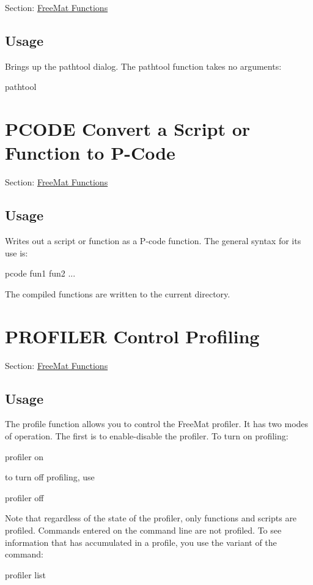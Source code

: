 Section\-: \hyperlink{sec_freemat}{Free\-Mat Functions} \hypertarget{vtkwidgets_vtkxyplotwidget_Usage}{}\subsection{Usage}\label{vtkwidgets_vtkxyplotwidget_Usage}
Brings up the pathtool dialog. The {\ttfamily pathtool} function takes no arguments\-: \begin{DoxyVerb}  pathtool
\end{DoxyVerb}
 \hypertarget{freemat_pcode}{}\section{P\-C\-O\-D\-E Convert a Script or Function to P-\/\-Code}\label{freemat_pcode}
Section\-: \hyperlink{sec_freemat}{Free\-Mat Functions} \hypertarget{vtkwidgets_vtkxyplotwidget_Usage}{}\subsection{Usage}\label{vtkwidgets_vtkxyplotwidget_Usage}
Writes out a script or function as a P-\/code function. The general syntax for its use is\-: \begin{DoxyVerb}   pcode fun1 fun2 ...
\end{DoxyVerb}
 The compiled functions are written to the current directory. \hypertarget{freemat_profiler}{}\section{P\-R\-O\-F\-I\-L\-E\-R Control Profiling}\label{freemat_profiler}
Section\-: \hyperlink{sec_freemat}{Free\-Mat Functions} \hypertarget{vtkwidgets_vtkxyplotwidget_Usage}{}\subsection{Usage}\label{vtkwidgets_vtkxyplotwidget_Usage}
The {\ttfamily profile} function allows you to control the Free\-Mat profiler. It has two modes of operation. The first is to enable-\/disable the profiler. To turn on profiling\-: \begin{DoxyVerb}  profiler on
\end{DoxyVerb}
 to turn off profiling, use \begin{DoxyVerb}  profiler off
\end{DoxyVerb}
 Note that regardless of the state of the profiler, only functions and scripts are profiled. Commands entered on the command line are not profiled. To see information that has accumulated in a profile, you use the variant of the command\-: \begin{DoxyVerb}  profiler list
\end{DoxyVerb}
